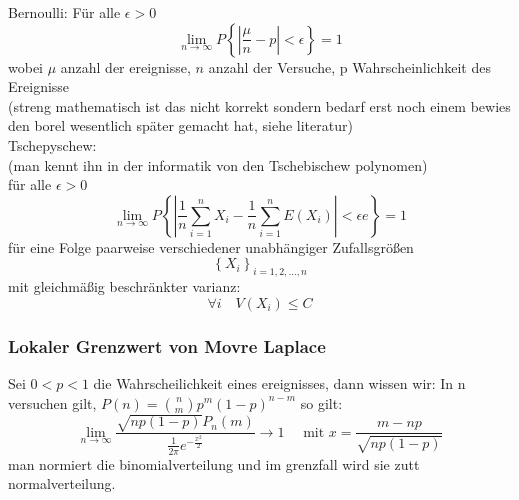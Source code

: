 \documentclass[a4paper]{article}
\theoremstyle{definition}
\theoremstyle{remark}
\begin{document}
Bernoulli: Für alle $\epsilon > 0 $ 
\begin{equation}
  \lim_{n \rightarrow \infty}P\left\{|\frac{\mu}{n}-p|<\epsilon \right\}=1
\end{equation}
 wobei $\mu$ anzahl der ereignisse, $n$ anzahl der Versuche, p Wahrscheinlichkeit des Ereignisse\\
 (streng mathematisch ist das nicht korrekt sondern bedarf erst noch einem bewies den borel wesentlich später gemacht hat, siehe literatur)\\
 Tschepyschew:\\
 (man kennt ihn in der informatik von den Tschebischew polynomen)\\
für alle $\epsilon >0$ 
\begin{equation}
  \lim_{n\rightarrow \infty}P\left\{ |\frac{1}{n}\sum_{i=1}^{n}X_i-\frac{1}{n}\sum_{i=1}^{n}E(X_i)|<\epsilon e \right\}=1
\end{equation}
für eine Folge paarweise verschiedener unabhängiger Zufallsgrößen
\begin{equation}
  \left\{ X_i \right\}_{i=1,2,\dots,n}
\end{equation}
mit gleichmäßig beschränkter varianz:
\begin{equation}
  \forall i \quad V(X_i)\leq C
\end{equation}
\subsubsection{Lokaler Grenzwert von Movre Laplace}
\label{ssub:lokaler_grenzwert_von_movre_laplace}

Sei $0<p<1$ die Wahrscheilichkeit eines ereignisses, dann wissen wir: In n versuchen gilt, $P(n)= \binom{n}{m}p^m(1-p)^{n-m}$ so gilt:\\
\begin{equation}
\lim_{n\rightarrow \infty} \frac{\sqrt{np(1-p)}P_n(m)}{\frac{1}{2\pi}e^{-\frac{x^2}{2}}}\rightarrow 1 \quad \textrm{ mit  }x= \frac{m-np}{\sqrt{np(1-p)}}
\end{equation}
man normiert die binomialverteilung und im grenzfall wird sie zutt normalverteilung.
\end{document}

